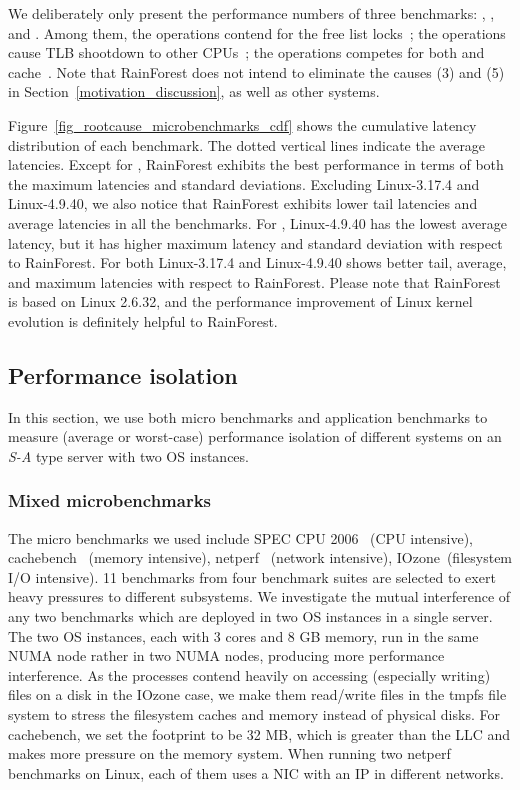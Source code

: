 \documentclass[pageno]{jpaper}
\begin{document}
 We deliberately  only present the performance numbers of three benchmarks:  , , and . Among them, the  operations contend for the free list locks~\cite{Michael:2004:SLD}; the  operations cause TLB shootdown to other CPUs~\cite{DiDi2011}; the  operations competes for both  and  cache~\cite{Tsai:2015:GMV}. Note that RainForest does not intend to eliminate the causes (3) and (5)  in Section~\ref{motivation_discussion}, as well as other systems.


Figure~\ref{fig_rootcause_microbenchmarks_cdf} shows the cumulative latency distribution of each benchmark. The dotted vertical lines indicate the average latencies. Except for , RainForest exhibits the best performance in terms of both the  maximum latencies and standard deviations.
Excluding Linux-3.17.4 and Linux-4.9.40, we also notice that RainForest exhibits lower tail latencies and average latencies in all the benchmarks.
For , Linux-4.9.40 has the lowest average latency, but it has higher  maximum latency and standard deviation with respect to RainForest. For  both Linux-3.17.4 and Linux-4.9.40 shows better tail, average, and maximum latencies with respect to RainForest.
Please note that RainForest is based on Linux 2.6.32, and the performance improvement of Linux kernel evolution is definitely helpful to RainForest.












\subsection{Performance isolation}
In this section, we use both micro benchmarks and application benchmarks to measure (average or worst-case) performance isolation of different systems on an \emph{S-A} type server with two OS instances.

\subsubsection{Mixed microbenchmarks}

The micro benchmarks we used include SPEC CPU 2006~\cite{henning:2006:speccpu} (CPU intensive), cachebench~\cite{Mucci:1998:cachebench} (memory intensive), netperf~\cite{jones:1996:netperf} (network intensive), IOzone~\cite{iozone_site}(filesystem I/O intensive). 11 benchmarks from four benchmark suites are selected to exert heavy pressures to different subsystems. We investigate the mutual interference of any two benchmarks which are deployed in two OS instances in a single server. The two OS instances, each with 3 cores and 8 GB memory, run in the same NUMA node rather in two NUMA nodes, producing more performance interference. As the processes contend heavily on accessing (especially writing) files on a disk in the IOzone case, we make them read/write files in the tmpfs file system to stress the filesystem caches and memory instead of physical disks. For cachebench, we set the footprint to be 32 MB, which is greater than the LLC and makes more pressure on the memory system. When running two netperf benchmarks on Linux, each of them uses a NIC with an IP in different networks.
\end{document}
